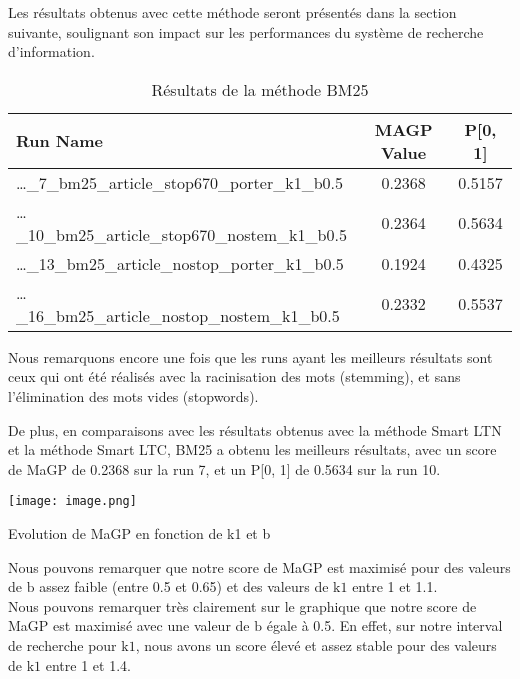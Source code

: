 \documentclass[a4paper, 12pt]{article}
\begin{document}
Les résultats obtenus avec cette méthode seront présentés dans la section suivante,
soulignant son impact sur les performances du système de recherche d'information.

\begin{table}[h]
  \centering
  \begin{tabular}{l c c}
      \toprule
      \textbf{Run Name} & \textbf{MAGP Value} & \textbf{P[0, 1]} \\
      \midrule
      \dots\_7\_bm25\_article\_stop670\_porter\_k1\_b0.5 & 0.2368 & 0.5157 \\
      \dots\_10\_bm25\_article\_stop670\_nostem\_k1\_b0.5 & 0.2364 & 0.5634 \\
      \dots\_13\_bm25\_article\_nostop\_porter\_k1\_b0.5 & 0.1924 & 0.4325 \\
      \dots\_16\_bm25\_article\_nostop\_nostem\_k1\_b0.5 & 0.2332 & 0.5537 \\
      \bottomrule
  \end{tabular}
  \caption{Résultats de la méthode BM25}
  \label{tab:result_bm25}
\end{table}

Nous remarquons encore une fois que les runs ayant les meilleurs résultats sont ceux qui ont été réalisés 
avec la racinisation des mots (stemming), et sans l'élimination des mots vides (stopwords).

De plus, en comparaisons avec les résultats obtenus avec la méthode Smart LTN et la méthode Smart LTC, BM25 
a obtenu les meilleurs résultats, avec un score de MaGP de 0.2368 sur la run 7, et un P[0, 1] de 0.5634 sur la run 10.
 

\begin{table}[!h]
    \begin{minipage}{0.55\linewidth}
        \centering
        \texttt{[image: image.png]}
        \label{fig:enter-label}
        \caption{Evolution de MaGP en fonction de k1 et b}
    \end{minipage}%
    \hspace{0.05\linewidth} %
    \begin{minipage}{0.45\linewidth}
        Nous pouvons remarquer que notre score de MaGP est maximisé pour des valeurs de $\text{b}$ 
        assez faible (entre 0.5 et 0.65) et des valeurs de $\text{k1}$ entre 1 et 1.1. \\

        Nous pouvons remarquer très clairement sur le graphique que notre score de MaGP est maximisé avec une valeur de $\text{b}$ 
        égale à 0.5. En effet, sur notre interval de recherche pour $\text{k1}$, nous avons un score élevé et assez stable 
        pour des valeurs de $\text{k1}$ entre 1 et 1.4.
    \end{minipage}
\end{table}
\end{document}
